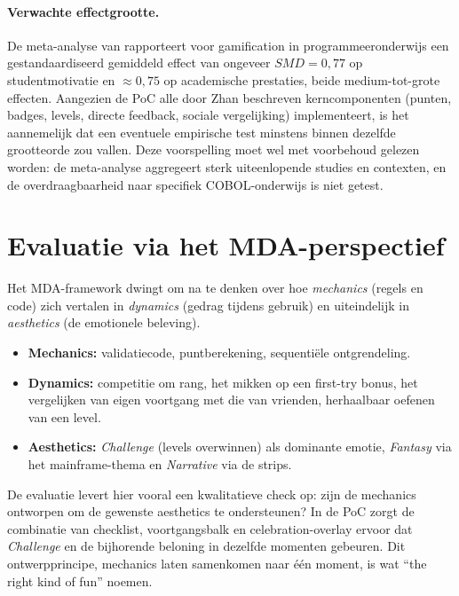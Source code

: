 \paragraph{Verwachte effectgrootte.}
De meta-analyse van \textcite{Zhan2022} rapporteert voor gamification in programmeeronderwijs een gestandaardiseerd gemiddeld effect van ongeveer \(SMD = 0{,}77\) op studentmotivatie en \(\approx 0{,}75\) op academische prestaties, beide medium-tot-grote effecten. 
Aangezien de PoC alle door Zhan beschreven kerncomponenten (punten, badges, levels, directe feedback, sociale vergelijking) implementeert, is het aannemelijk dat een eventuele empirische test minstens binnen dezelfde grootteorde zou vallen. 
Deze voorspelling moet wel met voorbehoud gelezen worden: de meta-analyse aggregeert sterk uiteenlopende studies en contexten, en de overdraagbaarheid naar specifiek COBOL-onderwijs is niet getest.

\section{Evaluatie via het MDA-perspectief}
\label{sec:evaluatie-mda}

Het MDA-framework \autocite{Hunicke2004} dwingt om na te denken over hoe \textit{mechanics} (regels en code) zich vertalen in \textit{dynamics} (gedrag tijdens gebruik) en uiteindelijk in \textit{aesthetics} (de emotionele beleving).

\begin{itemize}
    \item \textbf{Mechanics:} validatiecode, puntberekening, sequentiële ontgrendeling.
    \item \textbf{Dynamics:} competitie om rang, het mikken op een first-try bonus, het vergelijken van eigen voortgang met die van vrienden, herhaalbaar oefenen van een level.
    \item \textbf{Aesthetics:} \textit{Challenge} (levels overwinnen) als dominante emotie, \textit{Fantasy} via het mainframe-thema en \textit{Narrative} via de strips.
\end{itemize}

De evaluatie levert hier vooral een kwalitatieve check op: zijn de mechanics ontworpen om de gewenste aesthetics te ondersteunen?
In de PoC zorgt de combinatie van checklist, voortgangsbalk en celebration-overlay ervoor dat \textit{Challenge} en de bijhorende beloning in dezelfde momenten gebeuren. 
Dit ontwerpprincipe, mechanics laten samenkomen naar één moment, is wat \textcite{Hunicke2004} ``the right kind of fun'' noemen.

